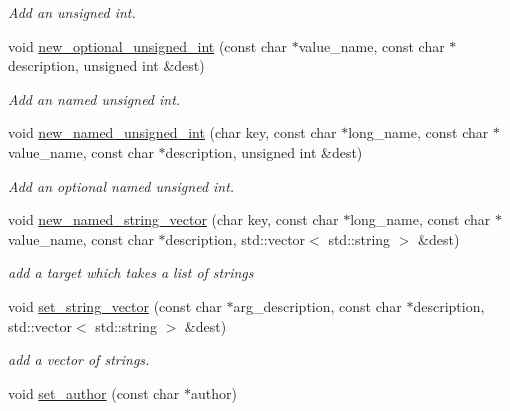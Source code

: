 \begin{DoxyCompactItemize}
\begin{DoxyCompactList}\small\item\em Add an unsigned int. \end{DoxyCompactList}\item 
\hypertarget{classdsr_1_1_argument__helper_aea760d54bdf8e004641bacd7e4403ddd}{
void \hyperlink{classdsr_1_1_argument__helper_aea760d54bdf8e004641bacd7e4403ddd}{new\_\-optional\_\-unsigned\_\-int} (const char $\ast$value\_\-name, const char $\ast$description, unsigned int \&dest)}
\label{classdsr_1_1_argument__helper_aea760d54bdf8e004641bacd7e4403ddd}

\begin{DoxyCompactList}\small\item\em Add an named unsigned int. \end{DoxyCompactList}\item 
\hypertarget{classdsr_1_1_argument__helper_a38be1301ff2f16e53cebd04808fc9a68}{
void \hyperlink{classdsr_1_1_argument__helper_a38be1301ff2f16e53cebd04808fc9a68}{new\_\-named\_\-unsigned\_\-int} (char key, const char $\ast$long\_\-name, const char $\ast$value\_\-name, const char $\ast$description, unsigned int \&dest)}
\label{classdsr_1_1_argument__helper_a38be1301ff2f16e53cebd04808fc9a68}

\begin{DoxyCompactList}\small\item\em Add an optional named unsigned int. \end{DoxyCompactList}\item 
void \hyperlink{classdsr_1_1_argument__helper_a2b09dd8f05c1e849d47257ef53726c37}{new\_\-named\_\-string\_\-vector} (char key, const char $\ast$long\_\-name, const char $\ast$value\_\-name, const char $\ast$description, std::vector$<$ std::string $>$ \&dest)
\begin{DoxyCompactList}\small\item\em add a target which takes a list of strings \end{DoxyCompactList}\item 
void \hyperlink{classdsr_1_1_argument__helper_a0d5db70fd2f94a7f3d3025820a0aad65}{set\_\-string\_\-vector} (const char $\ast$arg\_\-description, const char $\ast$description, std::vector$<$ std::string $>$ \&dest)
\begin{DoxyCompactList}\small\item\em add a vector of strings. \end{DoxyCompactList}\item 
\hypertarget{classdsr_1_1_argument__helper_a946afb85ad25f09410dfd861427e8e44}{
void \hyperlink{classdsr_1_1_argument__helper_a946afb85ad25f09410dfd861427e8e44}{set\_\-author} (const char $\ast$author)}
\label{classdsr_1_1_argument__helper_a946afb85ad25f09410dfd861427e8e44}


\end{DoxyCompactItemize}
